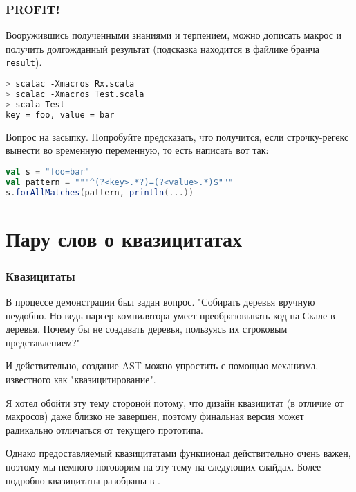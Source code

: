 \documentclass[hyperref={bookmarks=false}]{beamer}
\begin{document}
\begin{frame}[t,fragile]
\frametitle{PROFIT!}

Вооружившись полученными знаниями и терпением, можно дописать макрос и получить долгожданный результат (подсказка находится в файлике  бранча \texttt{result}).

\begin{lstlisting}[language=bash]
> scalac -Xmacros Rx.scala
> scalac -Xmacros Test.scala
> scala Test
key = foo, value = bar
\end{lstlisting}

Вопрос на засыпку. Попробуйте предсказать, что получится, если строчку-регекс вынести во временную переменную, то есть написать вот так:

\begin{lstlisting}[language=scala]
val s = "foo=bar"
val pattern = """^(?<key>.*?)=(?<value>.*)$"""
s.forAllMatches(pattern, println(...))
\end{lstlisting}%
\end{frame}

\section{Пару слов о квазицитатах}

\begin{frame}[t,fragile]
\frametitle{Квазицитаты}

В процессе демонстрации был задан вопрос. "Собирать деревья вручную неудобно. Но ведь парсер компилятора умеет преобразовывать код на Скале в деревья. Почему бы не создавать деревья, пользуясь их строковым представлением?"

И действительно, создание AST можно упростить с помощью механизма, известного как "квазицитирование".

Я хотел обойти эту тему стороной потому, что дизайн квазицитат (в отличие от макросов) даже близко не завершен, поэтому финальная версия может радикально отличаться от текущего прототипа.

Однако предоставляемый квазицитатами функционал действительно очень важен, поэтому мы немного поговорим на эту тему на следующих слайдах. Более подробно квазицитаты разобраны в .
\end{frame}
\end{document}
